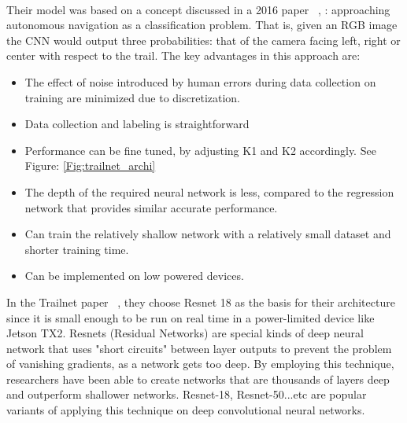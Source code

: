 \paragraph{}
Their model was based on a concept discussed in a 2016 paper ~\cite{trailnet},
: approaching autonomous navigation as a classification problem. That is, given an RGB image the CNN would output three probabilities: that of the camera facing left, right or center with respect to the trail. The key advantages in this approach are:

\begin{itemize}
    \item The effect of noise introduced by human errors during data collection on training are minimized due to discretization.
    \item Data collection and labeling is straightforward
    \item Performance can be fine tuned, by adjusting K1 and K2 accordingly. See Figure: \ref{Fig:trailnet_archi}
    \item The depth of the required neural network is less, compared to the regression network that provides similar accurate performance.
    \item Can train the relatively shallow network with a relatively small dataset and shorter training time.
    \item Can be implemented on low powered devices.
\end{itemize}

In the Trailnet paper ~\cite{trailnet}, they choose Resnet 18 as the basis for their architecture since it is small enough to be run on real time in a power-limited device like Jetson TX2. Resnets (Residual Networks) are special kinds of deep neural network that uses "short circuits" between layer outputs to prevent the problem of vanishing gradients, as a network gets too deep. By employing this technique, researchers have been able to create networks that are thousands of layers deep and outperform shallower networks. Resnet-18, Resnet-50...etc are popular variants of applying this technique on deep convolutional neural networks.

